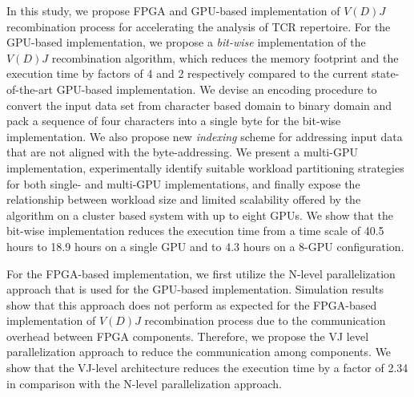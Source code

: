 \documentclass[thesis]{uathesis}
\begin{document}
In this study, we propose FPGA and GPU-based implementation of $V(D)J$ recombination process for accelerating the analysis of TCR repertoire. For the GPU-based implementation, we propose a \emph{bit-wise} implementation of the $V(D)J$ recombination algorithm, which reduces the memory footprint and the execution time by factors of 4 and 2 respectively compared to the current state-of-the-art GPU-based implementation. We devise an encoding procedure to convert the input data set from character based domain to binary domain and pack a sequence of four characters into a single byte for the bit-wise implementation. We also propose new \emph{indexing} scheme for addressing input data that are not aligned with the byte-addressing. We present a multi-GPU implementation, experimentally identify suitable workload partitioning strategies for both single- and multi-GPU implementations, and finally expose the relationship between workload size and limited scalability offered by the algorithm on a cluster based system with up to eight GPUs.  We show that the bit-wise implementation reduces the execution time from a time scale of 40.5 hours to 18.9 hours on a single GPU and to 4.3 hours on a 8-GPU configuration. 

For the FPGA-based implementation, we first utilize the N-level parallelization approach that is used for the GPU-based implementation. Simulation results show that this approach does not perform as expected for the FPGA-based implementation of $V(D)J$ recombination process due to the communication overhead between FPGA components. Therefore, we propose the VJ level parallelization approach to reduce the communication among components. We show that the VJ-level architecture reduces the execution time by a factor of 2.34 in comparison with the N-level parallelization approach. 







%

\renewcommand{\baselinestretch}{1}		%
\small\normalsize										%


\end{document}

